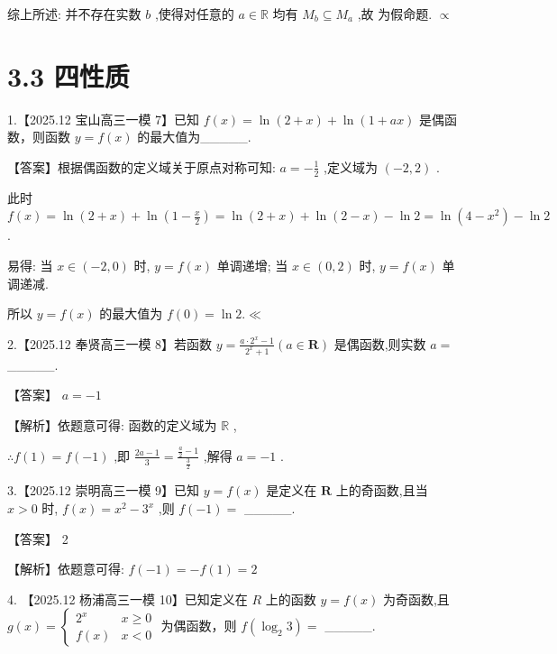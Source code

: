 \documentclass[10pt]{article}
\newcommand*\circled[1]{\tikz[baseline=(char.base)]{\node[shape=circle,draw,inner sep=1.5pt] (char) {\small #1};}}
\begin{document}
综上所述: 并不存在实数 \(b\) ,使得对任意的 \(a \in  \mathbb{R}\) 均有 \({M}_{b} \subseteq  {M}_{a}\) ,故  \circled{2} 为假命题. \(\propto\)

\section*{3.3 四性质}

1.【2025.12 宝山高三一模 7】已知 \(f\left( x\right)  = \ln \left( {2 + x}\right)  + \ln \left( {1 + {ax}}\right)\) 是偶函数，则函数 \(y = f\left( x\right)\) 的最大值为\_\_\_\_\_.

【答案】根据偶函数的定义域关于原点对称可知: \(a =  - \frac{1}{2}\) ,定义域为 \(\left( {-2,2}\right)\) .

此时 \(f\left( x\right)  = \ln \left( {2 + x}\right)  + \ln \left( {1 - \frac{x}{2}}\right)  = \ln \left( {2 + x}\right)  + \ln \left( {2 - x}\right)  - \ln 2 = \ln \left( {4 - {x}^{2}}\right)  - \ln 2\) .

易得: 当 \(x \in  \left( {-2,0}\right)\) 时, \(y = f\left( x\right)\) 单调递增; 当 \(x \in  \left( {0,2}\right)\) 时, \(y = f\left( x\right)\) 单调递减.

所以 \(y = f\left( x\right)\) 的最大值为 \(f\left( 0\right)  = \ln 2. \ll\)

2.【2025.12 奉贤高三一模 8】若函数 \(y = \frac{a \cdot  {2}^{x} - 1}{{2}^{x} + 1}\left( {a \in  \mathbf{R}}\right)\) 是偶函数,则实数 \(a =\) \_\_\_\_\_.

【答案】 \(a =  - 1\)

【解析】依题意可得: 函数的定义域为 \(\mathbb{R}\) ,

\(\therefore f\left( 1\right)  = f\left( {-1}\right)\) ,即 \(\frac{{2a} - 1}{3} = \frac{\frac{a}{2} - 1}{\frac{3}{2}}\) ,解得 \(a =  - 1\) .

3.【2025.12 崇明高三一模 9】已知 \(y = f\left( x\right)\) 是定义在 \(\mathbf{R}\) 上的奇函数,且当 \(x > 0\) 时, \(f\left( x\right)  = {x}^{2} - {3}^{x}\) ,则 \(f\left( {-1}\right)  =\) \_\_\_\_\_.

【答案】 2

【解析】依题意可得: \(f\left( {-1}\right)  =  - f\left( 1\right)  = 2\)

4. 【2025.12 杨浦高三一模 10】已知定义在 \(R\) 上的函数 \(y = f\left( x\right)\) 为奇函数,且 \(g\left( x\right)  = \left\{  \begin{matrix} {2}^{x} & x \geq  0 \\  f\left( x\right) & x < 0 \end{matrix}\right.\) 为偶函数，则 \(f\left( {{\log }_{2}3}\right)  =\) \_\_\_\_\_.
\end{document}

